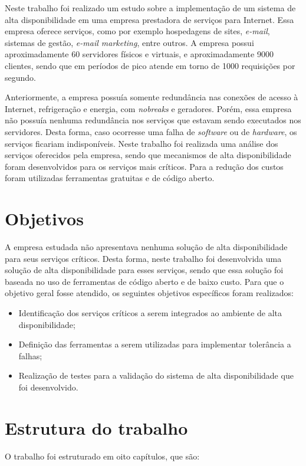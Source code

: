 Neste trabalho foi realizado um estudo sobre a implementação de um sistema de alta disponibilidade em uma empresa prestadora de serviços para 
Internet. Essa empresa oferece serviços, como por exemplo hospedagens de sites, \textit{e-mail}, sistemas de gestão, \textit{e-mail marketing}, 
entre outros. A empresa possui aproximadamente 60 servidores físicos e virtuais, e aproximadamente 9000 clientes, 
sendo que em períodos de pico atende em torno de 1000 requisições por segundo. 

Anteriormente, a empresa possuía somente redundância nas conexões de acesso à Internet, refrigeração e energia, com \textit{nobreaks} e geradores. 
Porém, essa empresa não possuía nenhuma redundância nos serviços que estavam sendo executados nos servidores. Desta forma, caso ocorresse
uma falha de \textit{software} ou de \textit{hardware}, os serviços ficariam indisponíveis. Neste trabalho foi realizada uma análise dos 
serviços oferecidos pela empresa, sendo que mecanismos de alta disponibilidade foram desenvolvidos para os serviços mais críticos. 
Para a redução dos custos foram utilizadas ferramentas gratuitas e de código aberto.

\section{Objetivos}
A empresa estudada não apresentava nenhuma solução de alta disponibilidade para seus serviços críticos. Desta forma, neste trabalho 
foi desenvolvida uma solução de alta disponibilidade para esses serviços, sendo que essa solução foi baseada no uso de ferramentas de 
código aberto e de baixo custo. Para que o objetivo geral fosse atendido, os seguintes objetivos específicos foram realizados:

\begin{itemize}
\item Identificação dos serviços críticos a serem integrados ao ambiente de alta disponibilidade;
\item Definição das ferramentas a serem utilizadas para implementar tolerância a falhas;
\item Realização de testes para a validação do sistema de alta disponibilidade que foi desenvolvido.
\end{itemize}

\section{Estrutura do trabalho}
O trabalho foi estruturado em oito capítulos, que são:

